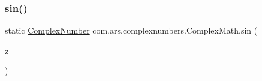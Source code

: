 \hypertarget{classcom_1_1ars_1_1complexnumbers_1_1_complex_math_a9c1d532e50ed32d01ccdb34d85e8765d}{}\label{classcom_1_1ars_1_1complexnumbers_1_1_complex_math_a9c1d532e50ed32d01ccdb34d85e8765d} 
\subsubsection{\texorpdfstring{sin()}{sin()}}
{\footnotesize\ttfamily static \hyperlink{classcom_1_1ars_1_1complexnumbers_1_1_complex_number}{Complex\+Number} com.\+ars.\+complexnumbers.\+Complex\+Math.\+sin (\begin{DoxyParamCaption}\item[{\hyperlink{classcom_1_1ars_1_1complexnumbers_1_1_complex_number}{Complex\+Number}}]{z }\end{DoxyParamCaption})\hspace{0.3cm}{\ttfamily [static]}}

